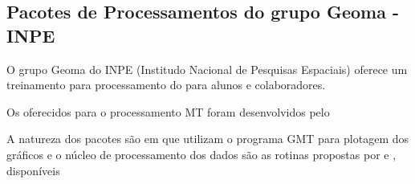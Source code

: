             
        \subsection{Pacotes de Processamentos do grupo Geoma - INPE}
    
        O grupo Geoma do INPE (Institudo Nacional de Pesquisas Espaciais) oferece um treinamento para processamento do \MT para alunos e colaboradores.
        
        Os  oferecidos para o processamento MT foram desenvolvidos pelo 
        
        A natureza dos pacotes são  em  que utilizam o programa GMT para plotagem dos gráficos e o núcleo de processamento dos dados são as rotinas propostas por \citeauthor{egbert97} e , disponíveis 
    
